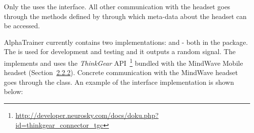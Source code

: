 \documentclass[a4paper,10pt,english,lof,lot,twoside]{puthesis}
\begin{document}
Only the  uses the  interface. All other
communication with the headset goes through the methods defined by 
through which meta-data about the headset can be accessed.

AlphaTrainer currently contains two  implementations:
 and  - both in the
 package. The  is used for
development and testing and it outputs a random signal.  The 
implements and uses the \emph{ThinkGear} API \footnote{
\href{http://developer.neurosky.com/docs/doku.php?id=thinkgear\_connector\_tgc}{http://developer.neurosky.com/docs/doku.php?id=thinkgear\_connector\_tgc}
} bundled with the MindWave Mobile headset
(Section {\hyperref[ch-background/index:ch-background-mindwave]{2.2.2}}). Concrete communication with the
MindWave headset goes through the  class. An example of the
 interface implementation is shown below:
\end{document}
